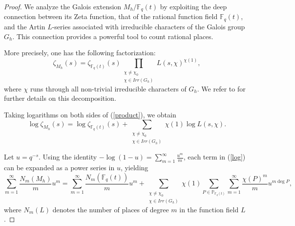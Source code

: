 \documentclass[1p,final]{elsarticle}
\newtheorem{open problem}[theorem]{Open Problem}
\begin{document}
	\begin{proof}

We analyze the Galois extension $M_{h}/\mathbb{F}_{q}(t)$ by exploiting the deep connection between its Zeta function, that of the rational function field $\mathbb{F}_q(t)$, and the Artin $L$-series associated with irreducible characters of the Galois group $G_{h}$. This connection provides a powerful tool to count rational places.

\medskip

More precisely, one has the following factorization:
\begin{equation}\label{product}
\zeta_{M_{h}}(s)=\zeta_{\mathbb{F}_q(t)}(s)\prod_{\substack{\chi\ne \chi_{0} \\ \chi\in Irr(G_{h})}}L(s,\chi)^{\chi(1)},
\end{equation}
where $\chi$ runs through all non-trivial irreducible characters of $G_h$. We refer to \cite{Rosen 2013} for further details on this decomposition.

\medskip

Taking logarithms on both sides of (\ref{product}), we obtain
\begin{equation}\label{log}
\log \zeta_{M_{h}}(s)=\log \zeta_{\mathbb{F}_q(t)}(s) +\sum_{\substack{\chi\ne \chi_{0} \\ \chi\in Irr(G_{h})}} \chi(1)\log L(s,\chi).
\end{equation}

Let $u=q^{-s}$. Using the identity $-\log(1-u)=\sum_{m=1}^{\infty}\frac{u^m}{m}$, each term in (\ref{log}) can be expanded as a power series in $u$, yielding
\begin{equation}
\sum_{m=1}^{\infty}\frac{N_{m}(M_h)}{m}u^{m}
=
\sum_{m=1}^{\infty}\frac{N_{m}(\mathbb{F}_q(t))}{m}u^{m}
+
\sum_{\substack{\chi\ne \chi_{0} \\ \chi\in Irr(G_{h})}}
\chi(1)\sum_{P\in \mathbb{P}_{\mathbb{F}_{q}(t)}}\sum_{m=1}^{\infty}\frac{\chi(P)^{m}}{m} u^{m\deg P},
\end{equation}
where $N_{m}(L)$ denotes the number of places of degree $m$ in the function field $L$.

\medskip


\end{proof}
\end{document}
